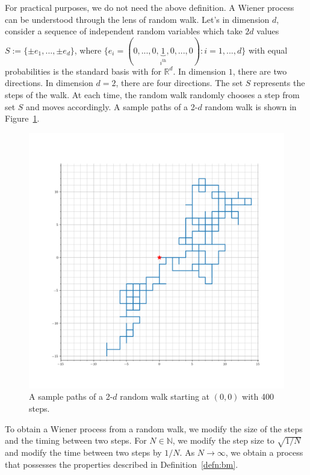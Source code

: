 \documentclass[11pt]{book}
\begin{document}
For practical purposes, we do not need the above definition. A Wiener process can be understood through the lens of random walk. Let's in dimension $d$, consider a sequence of independent random variables which take $2d$ values $S:=\{\pm e_1,...,\pm e_d\}$, where $\{e_i=(0,...,0,\underbrace{1}_{i^\text{th}},0,...,0):i=1,...,d\}$ with equal probabilities is the standard basis with for $\mathbb{R}^d$. In dimension $1$, there are two directions. In dimension $d=2$, there are four directions. The set $S$ represents the steps of the walk. At each time, the random walk randomly chooses a step from set $S$ and moves accordingly. A sample paths of a 2-$d$ random walk is shown in Figure~\ref{fig:rw}.
\begin{figure}[H]
    \centering
    \includegraphics[width=0.75\linewidth]{Control_lecture_notes/Figs/rw_2d_1.png}
    \caption{A sample paths of a 2-$d$ random walk starting at $(0,0)$ with 400 steps.}
    \label{fig:rw}
\end{figure}
To obtain a Wiener process from a random walk, we modify the size of the steps and the timing between two steps. For $N\in\mathbb{N}$, we modify the step size to $\sqrt{1/N}$ and modify the time between two steps by $1/N$. As $N\to\infty$, we obtain a process that possesses the properties described in Definition~\ref{defn:bm}. 
\end{document}
